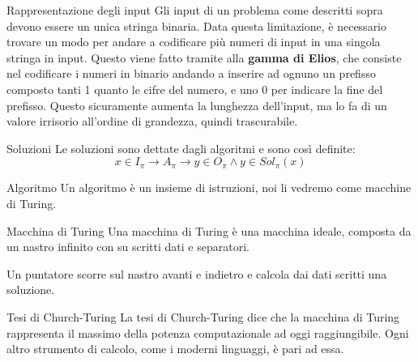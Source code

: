     \begin{paragrafo}{Rappresentazione degli input}
        Gli input di un problema come descritti sopra devono essere un unica stringa binaria. Data questa limitazione, è necessario trovare un modo per andare a codificare più numeri di input in una singola stringa in input.
        Questo viene fatto tramite alla \textbf{gamma di Elios}, che consiste nel codificare i numeri in binario andando a inserire ad ognuno un prefisso composto tanti 1 quanto le cifre del numero, e uno 0 per indicare la fine del prefisso.
        Questo sicuramente aumenta la lunghezza dell'input, ma lo fa di un valore irrisorio all'ordine di grandezza, quindi trascurabile.
    \end{paragrafo}


    \begin{paragrafo}{Soluzioni}
        Le soluzioni sono dettate dagli algoritmi e sono così definite:
        \[
            x\in I_\pi \rightarrow \boxed{A}_\pi \rightarrow y \in O_\pi \land y \in Sol_\pi(x)
        \]
    \end{paragrafo}

    \begin{paragrafo}{Algoritmo}
        Un algoritmo è un insieme di istruzioni, noi li vedremo come macchine di Turing.
    \end{paragrafo}

    \begin{paragrafo}{Macchina di Turing}
        Una macchina di Turing è una macchina ideale, composta da un nastro infinito con su scritti dati e separatori.

        Un puntatore scorre sul nastro avanti e indietro e calcola dai dati scritti una soluzione.

        \begin{paragrafo}{Tesi di Church-Turing}
            La tesi di Church-Turing dice che la macchina di Turing rappresenta il massimo della potenza computazionale ad oggi raggiungibile. Ogni altro strumento di calcolo, come i moderni linguaggi, è pari ad essa.
        \end{paragrafo}
    \end{paragrafo}

    

\paragraph{}
